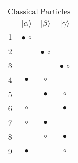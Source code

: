 \documentclass[11pt]{article}
\begin{document}
\begin{table}[h]
\renewcommand{\arraystretch}{1.2}
\begin{tabular}{c|ccc}
\multicolumn{4}{c}{Classical Particles} \\
&  $|\alpha\rangle$ & $|\beta\rangle$ & $|\gamma\rangle$ \\
\hline\hline
1 & $\bullet$ $\circ$ & & \\ \hline
2 & & $\bullet$ $\circ$ & \\  \hline
3 & & & $\bullet$ $\circ$ \\  \hline
4 &  $\bullet$ & $\circ$ & \\  \hline
5 & & $\bullet$ &  $\circ$ \\  \hline
6 &  $\circ$ & & $\bullet$ \\  \hline
7 &  $\circ$ & $\bullet$ &\\  \hline
8 &  &  $\circ$ & $\bullet$ \\  \hline
9 &  $\bullet$ & & $\circ$ \\
\hline\hline
\end{tabular}
\end{table}
\end{document}
